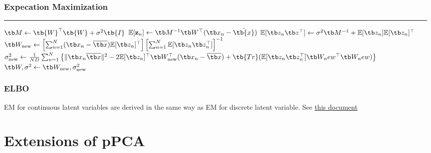 \documentclass{article}
\begin{document}
        \subsubsection{Expecation Maximization}
            \begin{algorithm}[H]
                \DontPrintSemicolon

                \caption{EM algorithm for pPCA}
                

                \BlankLine
                \hrule
                {
                    $\tb M \leftarrow \tb{W}^\top\tb{W}+\sigma^2\tb{I}$\;
                    $\mathbb{E}[\textbf{z}_n] \leftarrow \tb M^{-1}\tb W^\top(\tb x_n - \bar{\tb{x}})$\;
                    $\mathbb{E}[\tb z_n \tb z^\top] \leftarrow \sigma^2\tb M^{-1} + \mathbb{E}[\tb z_n]\mathbb{E}[\tb z_n]^\top$\;
                    $\tb W_{\text{new}} \leftarrow \left[ \sum_{n=1}^{N}(\tb x_n - \overline{\tb x})\mathbb{E}[\tb z_n]^\top \right] \left[ \sum_{n=1}^{N}\mathbb{E}[\tb z_n\tb z_n^\top] \right]^{-1}$\;
                    $\sigma_{\text{new}}^2 \leftarrow \frac{1}{ND}\sum_{n=1}^{N}\left\{ \|\tb x_n \overline{\tb x}\|^2 -2\mathbb{E}[\tb z_n]^\top\tb W_{\text{new}}^\top(\tb x_n -\overline{\tb x})
                    + \tb{Tr}(\mathbb{E}[\tb z_n \tb z_n^\top]\tb W_new^\top \tb W_new)\right\}$\;
                    $\tb W, \sigma^2 \leftarrow \tb W_{\text{new}}, \sigma^2_{\text{new}}$\;
                }
                \end{algorithm}
        \subsubsection{ELBO}
            EM for continuous latent variables are derived in the same way as EM for discrete latent variable. See \href{run:../inference/em_algorithm/em_algorithm.pdf}{this document}

\section{Extensions of pPCA}
\end{document}
